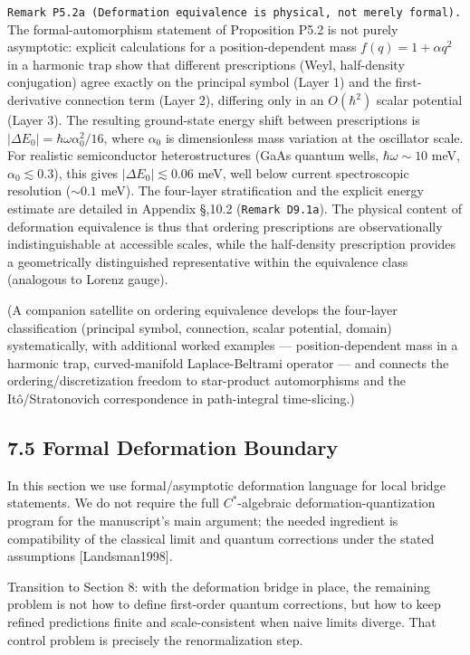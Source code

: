 \documentclass[
]{article}
\begin{document}
\texttt{Remark\ P5.2a\ (Deformation\ equivalence\ is\ physical,\ not\ merely\ formal).}
The formal-automorphism statement of Proposition P5.2 is not purely
asymptotic: explicit calculations for a position-dependent mass
\(f(q)=1+\alpha q^2\) in a harmonic trap show that different
prescriptions (Weyl, half-density conjugation) agree exactly on the
principal symbol (Layer 1) and the first-derivative connection term
(Layer 2), differing only in an \(O(\hbar^2)\) scalar potential (Layer
3). The resulting ground-state energy shift between prescriptions is
\(|\Delta E_0|=\hbar\omega\alpha_0^2/16\), where \(\alpha_0\) is
dimensionless mass variation at the oscillator scale. For realistic
semiconductor heterostructures (GaAs quantum wells,
\(\hbar\omega\sim 10\) meV, \(\alpha_0\lesssim 0.3\)), this gives
\(|\Delta E_0|\lesssim 0.06\) meV, well below current spectroscopic
resolution (\(\sim 0.1\) meV). The four-layer stratification and the
explicit energy estimate are detailed in Appendix \S,10.2
(\texttt{Remark\ D9.1a}). The physical content of deformation
equivalence is thus that ordering prescriptions are observationally
indistinguishable at accessible scales, while the half-density
prescription provides a geometrically distinguished representative
within the equivalence class (analogous to Lorenz gauge).

(A companion satellite on ordering equivalence develops the four-layer
classification (principal symbol, connection, scalar potential, domain)
systematically, with additional worked examples --- position-dependent
mass in a harmonic trap, curved-manifold Laplace-Beltrami operator ---
and connects the ordering/discretization freedom to star-product
automorphisms and the Itô/Stratonovich correspondence in path-integral
time-slicing.)

\hypertarget{formal-deformation-boundary}{%
\subsection{7.5 Formal Deformation
Boundary}\label{formal-deformation-boundary}}

In this section we use formal/asymptotic deformation language for local
bridge statements. We do not require the full \(C^\ast\)-algebraic
deformation-quantization program for the manuscript's main argument; the
needed ingredient is compatibility of the classical limit and quantum
corrections under the stated assumptions {[}Landsman1998{]}.

Transition to Section 8: with the deformation bridge in place, the
remaining problem is not how to define first-order quantum corrections,
but how to keep refined predictions finite and scale-consistent when
naive limits diverge. That control problem is precisely the
renormalization step.
\end{document}
